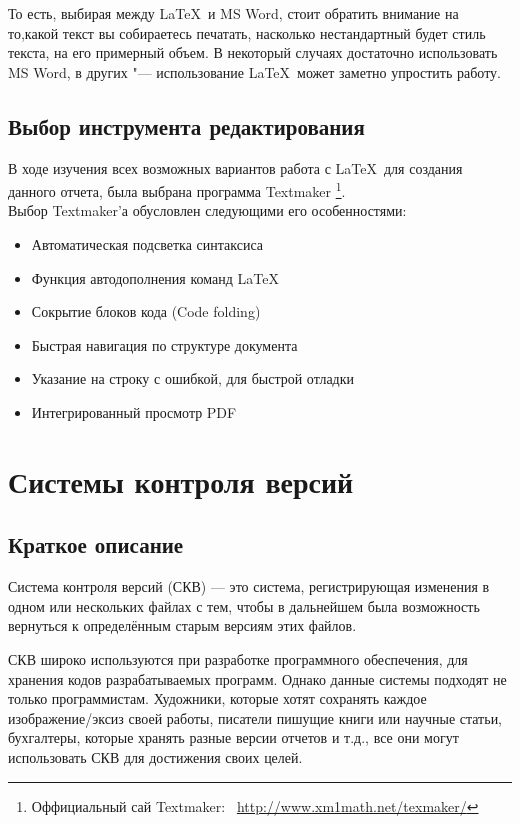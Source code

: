 \documentclass{article}
\begin{document}
    		То есть, выбирая между \LaTeX ~и MS Word, стоит обратить внимание на то,какой текст вы собираетесь печатать, 					насколько нестандартный будет стиль текста, на его примерный объем. В некоторый случаях достаточно использовать MS Word,   		в других "--- использование \LaTeX ~может заметно упростить работу.
		\newpage		
		\subsection{Выбор инструмента редактирования}
			В ходе изучения всех возможных вариантов работа с \LaTeX ~для создания данного отчета, была выбрана программа 						Textmaker
			\footnote{Оффициальный сай Textmaker:~ \href{http://www.xm1math.net/texmaker/}{http://www.xm1math.net/texmaker/}}.\\
			Выбор Textmaker'а обусловлен следующими его особенностями:
			\begin{itemize} 
	    		\item	Автоматическая подсветка синтаксиса
	    		\item	Функция автодополнения команд \LaTeX
	    		\item	Сокрытие блоков кода (Code folding)
	    		\item	Быстрая навигация по структуре документа
	    		\item	Указание на строку с ошибкой, для быстрой отладки
	    		\item	Интегрированный просмотр PDF
			\end{itemize} 
	\newpage
	\section{Системы контроля версий}
		\subsection{Краткое описание}
			Система контроля версий (СКВ) — это система, регистрирующая изменения в одном или нескольких файлах с тем, чтобы в 				дальнейшем была возможность вернуться к определённым старым версиям этих файлов. 
				
			СКВ широко используются при разработке программного обеспечения, для хранения кодов разрабатываемых программ. Однако 			данные системы подходят не только программистам. Художники, которые хотят сохранять каждое изображение/эксиз своей 					работы, писатели пишущие книги или научные статьи, бухгалтеры, которые хранять разные версии отчетов и т.д., все они 				могут использовать СКВ для достижения своих целей.
				
\end{document}
